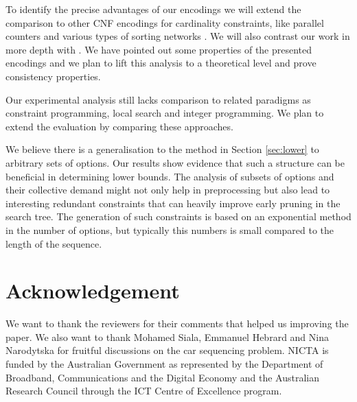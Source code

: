\documentclass[]{easychair}
\begin{document}
To identify the precise advantages of our encodings we will extend the comparison to other CNF encodings for cardinality
constraints, like parallel counters and various types of sorting networks \cite{Codish10}\cite{Asin11}.  We will also
contrast our work in more depth with \cite{Bacchus07}.  We have pointed out some properties of the presented encodings
and we plan to lift this analysis to a theoretical level and prove consistency properties. 

Our experimental analysis still lacks comparison to related paradigms as constraint programming, local search and
integer programming.  We plan to extend the evaluation by comparing these approaches. 


We believe there is a generalisation to the method in Section \ref{sec:lower} to arbitrary sets of options. Our results
show evidence that such a structure can be beneficial in determining lower bounds. The analysis of subsets of options
and their collective demand might not only help in preprocessing but also lead to interesting redundant constraints that
can heavily improve early pruning in the search tree. The generation of such constraints is based on an exponential
method in the number of options, but typically this numbers is small compared to the length of the sequence. 

\section*{Acknowledgement}

We want to thank the reviewers for their comments that helped us improving the paper.  We also want to thank Mohamed
Siala, Emmanuel Hebrard and Nina Narodytska for fruitful discussions on the car sequencing problem. NICTA is funded by the Australian Government as represented by the Department of Broadband, Communications and the
Digital Economy and the Australian Research Council through the ICT Centre of Excellence program.




\end{document}
